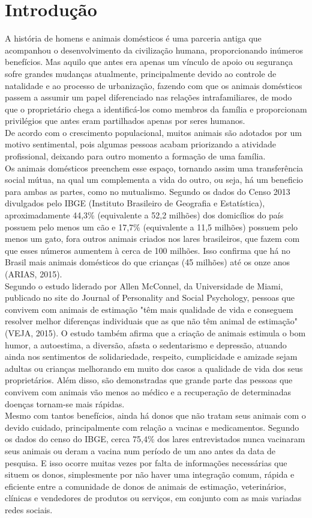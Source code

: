 \chapter{Introdução}
\setcounter{page}{11}
A história de homens e animais domésticos é uma parceria antiga que acompanhou o desenvolvimento da civilização humana, proporcionando inúmeros benefícios. Mas aquilo que antes era apenas um vínculo de apoio ou segurança sofre grandes mudanças atualmente, principalmente devido ao controle de natalidade e ao processo de urbanização, fazendo com que os animais domésticos passem a assumir um papel diferenciado nas relações intrafamiliares, de modo que o proprietário chega a identificá-los como membros da família e proporcionam privilégios que antes eram partilhados apenas por seres humanos.
\\
\indent
De acordo com o crescimento populacional, muitos animais são adotados por um motivo sentimental, pois algumas pessoas acabam priorizando a atividade profissional, deixando para outro momento a formação de uma família.
\\
\indent
Os animais domésticos preenchem esse espaço, tornando assim uma transferência social mútua, na qual um complementa a vida do outro, ou seja, há um beneficio para ambas as partes, como no mutualismo. Segundo os dados do Censo 2013 divulgados pelo IBGE (Instituto Brasileiro de Geografia e Estatística), aproximadamente 44,3\% (equivalente a 52,2 milhões) dos domicílios do país possuem pelo menos um cão e 17,7\% (equivalente a 11,5 milhões) possuem pelo menos um gato, fora outros animais criados nos lares brasileiros, que fazem com que esses números aumentem à cerca de 100 milhões. Isso confirma que há no Brasil mais animais domésticos do que crianças (45 milhões) até os onze anos (ARIAS, 2015). 
\\
\indent
Segundo o estudo liderado por Allen McConnel, da Universidade de Miami, publicado no site do Journal of Personality and Social Psychology, pessoas que convivem com animais de estimação "têm mais qualidade de vida e conseguem resolver melhor diferenças individuais que as que não têm animal de estimação" (VEJA, 2015). O estudo também afirma que a criação de animais estimula o bom humor, a autoestima, a diversão,  afasta o sedentarismo e depressão, atuando ainda nos sentimentos de solidariedade, respeito, cumplicidade e amizade sejam adultas ou crianças melhorando em muito dos casos a qualidade de vida dos seus proprietários. Além disso, são demonstradas que grande parte das pessoas que convivem com animais vão menos ao médico e a recuperação de determinadas doenças tornam-se mais rápidas. 
\\
\indent
Mesmo com tantos benefícios, ainda há donos que não tratam seus animais com o devido cuidado, principalmente com relação a vacinas e medicamentos. Segundo os dados do censo do IBGE, cerca 75,4\% dos lares entrevistados nunca vacinaram seus animais ou deram a vacina num período de um ano antes da data de pesquisa. E isso ocorre muitas vezes por falta de informações necessárias que situem os donos, simplesmente por não haver uma integração comum, rápida e eficiente entre a comunidade de donos de animais de estimação, veterinários, clínicas e vendedores de produtos ou serviços, em conjunto com as mais variadas redes sociais.

